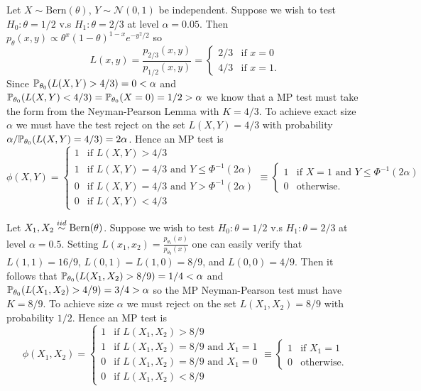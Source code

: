 \begin{example}
	Let $X \sim \text{Bern}(\theta)$, $Y \sim \mathcal N(0, 1)$ be independent. Suppose we wish to test $H_0 : \theta = 1/2$ v.s $H_1 : \theta = 2/3$ at level $\alpha = 0.05$. Then $p_\theta(x, y) \propto \theta^x (1-\theta)^{1-x} e^{-y^2/2}$ so \[
		L(x, y) = \frac{p_{2/3}(x, y)}{p_{1/2}(x, y)} = \begin{cases}
			2/3 &\text{if } x = 0 \\
			4/3 &\text{if } x = 1.
		\end{cases}
	\] Since $\mathbb{P}_{\theta_0}(L(X, Y) > 4/3) = 0 < \alpha$ and $\mathbb{P}_{\theta_0}(L(X, Y) < 4/3) = \mathbb{P}_{\theta_0}(X = 0) = 1/2 > \alpha$ we know that a MP test must take the form from the Neyman-Pearson Lemma with $K = 4/3$. To achieve exact size $\alpha$ we must have the test reject on the set $L(X, Y) = 4/3$ with probability $\alpha / \mathbb{P}_{\theta_0}(L(X, Y) = 4/3) = 2\alpha$. Hence an MP test is \[
		\phi(X, Y) =
		 \begin{cases}
			1 & \text{if } L(X, Y) > 4/3 \\
			1 & \text{if } L(X, Y) = 4/3 \text{ and } Y \leq \Phi^{-1}(2\alpha) \\
			0 & \text{if } L(X, Y) = 4/3 \text{ and } Y > \Phi^{-1}(2\alpha) \\
			0 & \text{if } L(X, Y) < 4/3
		\end{cases} \equiv
		 \begin{cases}
			1 & \text{if } X = 1 \text{ and } Y \leq \Phi^{-1}(2\alpha) \\
			0 & \text{otherwise.}
		\end{cases}
	\]
\end{example}

\begin{example}
		Let $X_1, X_2 \overset{iid}{\sim} \text{Bern}(\theta)$. Suppose we wish to test $H_0 : \theta = 1/2$ v.s $H_1 : \theta = 2/3$ at level $\alpha = 0.5$. Setting $L(x_1, x_2) = \frac{p_{\theta_1}(x)}{p_{\theta_0}(x)}$ one can easily verify that $L(1, 1) = 16/9$, $L(0,1) = L(1,0) = 8/9$, and $L(0, 0) = 4/9$. Then it follows that $\mathbb{P}_{\theta_0}(L(X_1, X_2) > 8/9) = 1/4 < \alpha$ and $\mathbb{P}_{\theta_0}(L(X_1, X_2) > 4/9) = 3/4 > \alpha$ so the MP Neyman-Pearson test must have $K = 8/9$. To achieve size $\alpha$ we must reject on the set $L(X_1, X_2) = 8/9$ with probability $1/2$. Hence an MP test is \[
			\phi(X_1, X_2) =
			\begin{cases}
				1 & \text{if } L(X_1, X_2) > 8/9 \\
				1 & \text{if } L(X_1, X_2) = 8/9  \text{ and } X_1  = 1  \\
				0 & \text{if } L(X_1, X_2) = 8/9 \text{ and } X_1  = 0  \\
				0 & \text{if } L(X_1, X_2) < 8/9 
			\end{cases} \equiv
			\begin{cases}
				1 & \text{if } X_1 = 1 \\
				0 & \text{otherwise.}
			\end{cases}
		\]
\end{example}

